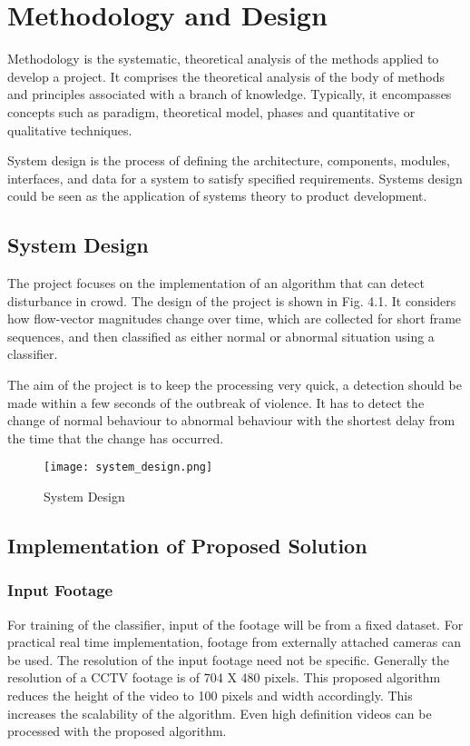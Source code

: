 \chapter{Methodology and Design}
Methodology is the systematic, theoretical analysis of the methods applied to develop a project. It comprises the theoretical analysis of the body of methods and principles associated with a branch of knowledge. Typically, it encompasses concepts such as paradigm, theoretical model, phases and quantitative or qualitative techniques.
\par
System design is the process of defining the architecture, components, modules, interfaces, and data for a system to satisfy specified requirements. Systems design could be seen as the application of systems theory to product development.
\section{System Design}
The project focuses on the implementation of an algorithm that can detect disturbance in crowd. The design of the project is shown in Fig. 4.1. It considers how flow-vector magnitudes change over time, which are collected for short frame sequences, and then classified as either normal or abnormal situation using a classifier.
\par
The aim of the project is to keep the processing very quick, a detection should be made within a few seconds of the outbreak of violence. It has to detect the change of normal behaviour to abnormal behaviour with the shortest delay from the time that the change has occurred.

\begin{figure}[H]
\centering
\texttt{[image: system\_design.png]}
\caption{System Design}
\end{figure}

\section{Implementation of Proposed Solution}
\subsection{Input Footage}
For training of the classifier, input of the footage will be from a fixed dataset. For practical real time implementation, footage from externally attached cameras can be used. The resolution of the input footage need not be specific. Generally the resolution of a CCTV footage is of 704 X 480 pixels. This proposed algorithm reduces the height of the video to 100 pixels and width accordingly. This increases the scalability of the algorithm. Even high definition videos can be processed with the proposed algorithm.
